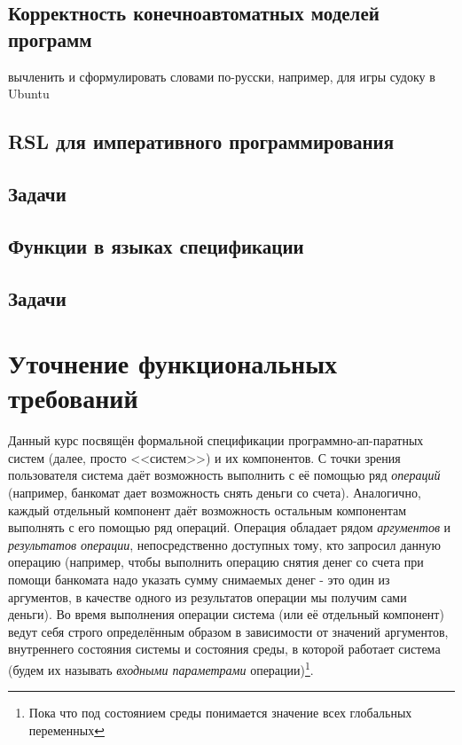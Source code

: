 \documentclass[14pt, twoside]{extreport}
\newcounter{problem_type}[chapter]
\begin{document}
\section{Корректность конечноавтоматных моделей программ}
вычленить и сформулировать словами по-русски, например, для игры судоку в Ubuntu

\section{RSL для императивного программирования}

    

    \section*{Задачи}

    

\section{Функции в языках спецификации}

    

    \section*{Задачи}

    

    




\chapter{Уточнение функциональных требований}



Данный курс посвящён формальной спецификации программно-ап-паратных систем (далее, просто <<систем>>) и их компонентов. С точки зрения пользователя система даёт возможность выполнить с её помощью ряд \emph{операций} (например, банкомат дает возможность снять деньги со счета). Аналогично, каждый отдельный компонент даёт возможность остальным компонентам выполнять с его помощью ряд операций. Операция обладает рядом \emph{аргументов} и \emph{результатов операции}, непосредственно доступных тому, кто запросил данную операцию (например, чтобы выполнить операцию снятия денег со счета при помощи банкомата надо указать сумму снимаемых денег - это один из аргументов, в качестве одного из результатов операции мы получим сами деньги). Во время выполнения операции система (или её отдельный компонент) ведут себя строго определённым образом в зависимости от значений аргументов, внутреннего состояния системы и состояния среды, в которой работает система (будем их называть \emph{входными параметрами} операции)\footnote{Пока что под состоянием среды понимается значение всех глобальных переменных}.
\end{document}
